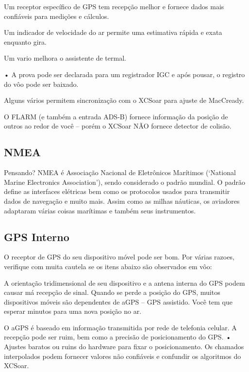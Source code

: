 \documentclass[a4paper,12pt,utf8]{scrreprt}
\begin{document}
\begin{compactitem}
\item Um receptor específico de GPS tem recepção melhor e fornece dados mais confiáveis para medições e cálculos.
\item Um indicador de velocidade do ar permite uma estimativa rápida e exata enquanto gira.
\item Um vario melhora o assistente de termal.
\item • A prova pode ser declarada para um registrador IGC e após pousar, o registro do vôo pode ser baixado.
\item Alguns vários permitem sincronização com o XCSoar para ajuste de MacCready.
\item O FLARM (e também a entrada ADS-B) fornece informação da posição de outros ao redor de você – porém o XCSoar NÃO fornece detector de colisão.
\end{compactitem}

\subsection{\textcolor{flashblue}{NMEA}}
Pensando? NMEA é Associação Nacional de Eletrônicos Marítimos (‘National Marine Electronics Association’), sendo considerado o padrão mundial.  O padrão define as interfaces elétricas bem como os protocolos usados para transmitir dados de navegação e muito mais.  Assim como as milhas náuticas, os aviadores adaptaram várias coisas marítimas e também seus instrumentos.

\subsection{\textcolor{flashblue}{GPS Interno}}
O receptor de GPS do seu dispositivo móvel pode ser bom.  Por várias razoes, verifique com muita cautela se os itens abaixo são observados em vôo:

\begin{compactitem}
\item A orientação tridimensional de seu dispositivo e a antena interna do GPS podem causar má recepção de sinal.  Quando se perde a posição do GPS, muitos dispositivos móveis são dependentes de aGPS – GPS assistido.  Você tem que esperar minutos para uma nova posição no ar.  
\item O aGPS é baseado em informação transmitida por rede de telefonia celular.  A recepção pode ser ruim, bem como a precisão de posicionamento do GPS.
• Ajustes baratos ou ruins do hardware para fixar o posicionamento.  Os chamados interpolados podem fornecer valores não confiáveis e confundir os algoritmos do XCSoar.

\end{compactitem}
\end{document}
